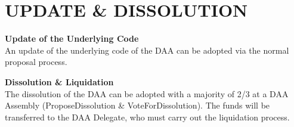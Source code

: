 \section{UPDATE \& DISSOLUTION}

\item \textbf{Update of the Underlying Code} \\
An update of the underlying code of the DAA can be adopted via the normal proposal process.

\item \textbf{Dissolution \& Liquidation} \\
The dissolution of the DAA can be adopted with a majority of 2/3 at a DAA Assembly (ProposeDissolution \& VoteForDissolution). %
The funds will be transferred to the DAA Delegate, who must carry out the liquidation process.
